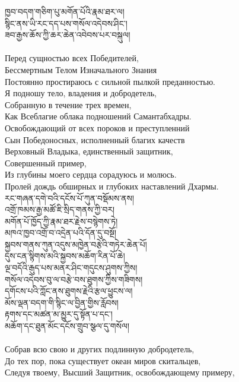ཁྱབ་བདག་གཅིག་པུ་མགོན་པོའི་རྣམ་ཐར་ལ།\\
སྙིང་ནས་ཡི་རང་དད་པས་གསོལ་འདེབས་ཤིང་།\\
ཟབ་རྒྱས་ཆོས་ཀྱི་ཆར་ཆེན་འབེབས་པར་བསྐུལ། \\
\\
\ru
Перед сущностью всех Победителей, \\
Бессмертным Телом Изначального Знания \\
Постоянно простираюсь с сильной пылкой преданностью. \\
Я подношу тело, владения и добродетель, \\
Собранную в течение трех времен, \\
Как Всеблагие облака подношений Самантабхадры. \\
Освобождающий от всех пороков и преступленний \\
Сын Победоносных, исполненный благих качеств \\
Верховный Владыка, единственный защитник, \\
Совершенный пример, \\
Из глубины моего сердца сорадуюсь и молюсь. \\
Пролей дождь обширных и глубоких наставлений Дхармы. \\
\newpage
\ti
རང་གཞན་དགེ་བའི་དངོས་པོ་ཀུན་བསྡོམས་ནས།\\
འགྲོ་ཁམས་རྒྱ་མཚོ་ཇི་སྲིད་གནས་ཀྱི་བར།\\
མགོན་པོ་ཁྱོད་ཀྱི་རྣམ་ཐར་རྗེས་བསྙེགས་ཏེ།\\
མཁའ་ཁྱབ་འགྲོ་བ་འདྲེན་པའི་དོན་དུ་བསྔོ།\\
སྐྱབས་གནས་ཀུན་འདུས་མཁྱེན་བརྩེའི་གཏེར་ཆེན་པོ།\\
དུས་ངན་སྙིགས་མའི་སྐྱབས་མཆོག་རིན་པོ་ཆེ།\\
ལྔ་བདོའི་རྒུད་པས་མནར་ཤིང་གདུངས་ཤུགས་ཀྱིས།\\
གསོལ་འདེབས་བུ་ལ་བརྩེ་བས་ཐུགས་ཀྱིས་གཟིགས། \\
དགོངས་པའི་ཀློང་ནས་ཐུགས་རྗེའི་རྩལ་ཕྱུངས་ལ།\\
མོས་ལྡན་བདག་གི་སྙིང་ལ་བྱིན་གྱིས་རློབས།\\
རྟགས་དང་མཚན་མ་མྱུར་དུ་སྟོན་པ་དང་།\\
མཆོག་དང་ཐུན་མོང་དངོས་གྲུབ་སྩལ་དུ་གསོལ།\\
\\
\ru
Собрав всю свою и других подлинную добродетель, \\
До тех пор, пока существует океан миров скитальцев, \\
Следуя твоему, Высший Защитник, освобождающему примеру, \\
